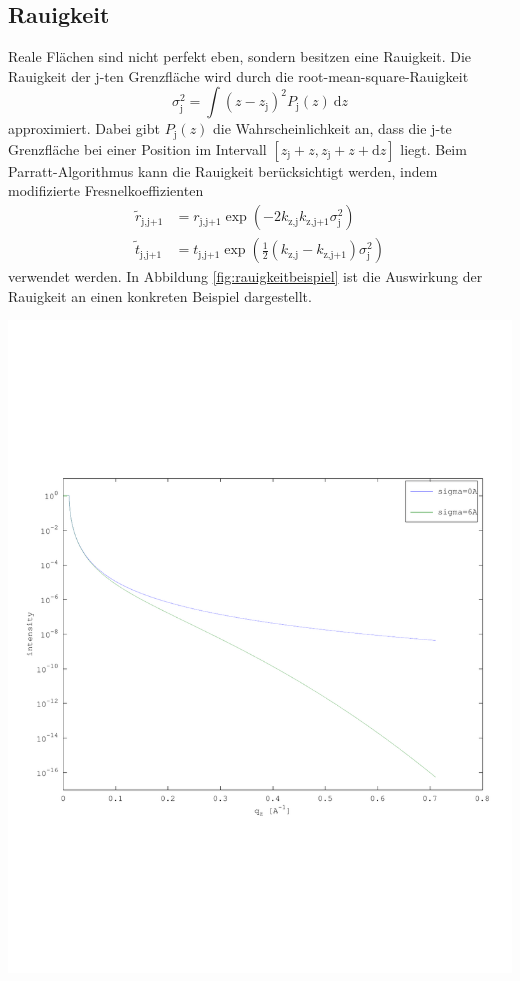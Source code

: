 \documentclass[captions=tableheading]{scrartcl}
\newcommand{\indx}[1]{\text{#1}}
\begin{document}
\subsection{Rauigkeit}
Reale Flächen sind nicht perfekt eben, sondern besitzen eine Rauigkeit.
Die Rauigkeit der j-ten Grenzfläche wird durch die root-mean-square-Rauigkeit
\begin{equation}
\sigma_\indx{j}^2=\int \left(z-z_\indx{j} \right)^2 P_\indx{j}\left(z\right)~\mathrm{d}z
\end{equation}
approximiert.
Dabei gibt $P_\indx{j}\left(z\right)$ die Wahrscheinlichkeit an, dass die j-te Grenzfläche bei einer Position im Intervall $\left[z_\indx{j}+ z, z_\indx{j}+ z+\mathrm{d}z \right]$ liegt.
Beim Parratt-Algorithmus kann die Rauigkeit berücksichtigt werden, indem modifizierte Fresnelkoeffizienten
\begin{align}
\tilde{r}_\indx{j,j+1}&=r_\indx{j,j+1}\exp\left( -2k_\indx{z,j}k_\indx{z,j+1}\sigma_\indx{j}^2 \right) \\
\tilde{t}_\indx{j,j+1}&=t_\indx{j,j+1}\exp\left( \frac{1}{2}\left(k_\indx{z,j}-k_\indx{z,j+1}\right)\sigma_\indx{j}^2 \right)
\end{align}
verwendet werden. In Abbildung \ref{fig:rauigkeitbeispiel} ist die Auswirkung der Rauigkeit an einen konkreten Beispiel dargestellt.

\begin{center}
	\includegraphics[width=0.9 \textwidth]{images/reflektivitaet_rau.pdf}
	\label{fig:rauigkeitbeispiel}
\end{center}
\end{document}
